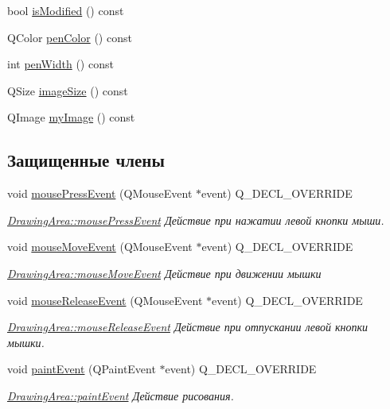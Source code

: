 \begin{DoxyCompactItemize}
bool \hyperlink{class_drawing_area_a727f9acc4083f97aa439eb6a6cb57adc}{is\+Modified} () const 
\item 
Q\+Color \hyperlink{class_drawing_area_a666bda2b4d8fc9bf5ea726f7c4b66df0}{pen\+Color} () const 
\item 
int \hyperlink{class_drawing_area_a2fbaa03b53f44c06190f72e6aad4f5fa}{pen\+Width} () const 
\item 
Q\+Size \hyperlink{class_drawing_area_af2a4193b01b408d8a9bbba44dfcefb77}{image\+Size} () const 
\item 
Q\+Image \hyperlink{class_drawing_area_a420f3cdf3a9f6df2f65d3a1e1b4c9d4d}{my\+Image} () const 
\end{DoxyCompactItemize}
\subsection*{Защищенные члены}
\begin{DoxyCompactItemize}
\item 
void \hyperlink{class_drawing_area_aa1fc7e0984fd5cb177956a894b106cf8}{mouse\+Press\+Event} (Q\+Mouse\+Event $\ast$event) Q\+\_\+\+D\+E\+C\+L\+\_\+\+O\+V\+E\+R\+R\+I\+D\+E
\begin{DoxyCompactList}\small\item\em \hyperlink{class_drawing_area_aa1fc7e0984fd5cb177956a894b106cf8}{Drawing\+Area\+::mouse\+Press\+Event} Действие при нажатии левой кнопки мыши. \end{DoxyCompactList}\item 
void \hyperlink{class_drawing_area_a4b4f2dbb4d819d5dd502142f4de4eee8}{mouse\+Move\+Event} (Q\+Mouse\+Event $\ast$event) Q\+\_\+\+D\+E\+C\+L\+\_\+\+O\+V\+E\+R\+R\+I\+D\+E
\begin{DoxyCompactList}\small\item\em \hyperlink{class_drawing_area_a4b4f2dbb4d819d5dd502142f4de4eee8}{Drawing\+Area\+::mouse\+Move\+Event} Действие при движении мышки \end{DoxyCompactList}\item 
void \hyperlink{class_drawing_area_ad97c6c8e6e2f444f26b76b73ffa30eea}{mouse\+Release\+Event} (Q\+Mouse\+Event $\ast$event) Q\+\_\+\+D\+E\+C\+L\+\_\+\+O\+V\+E\+R\+R\+I\+D\+E
\begin{DoxyCompactList}\small\item\em \hyperlink{class_drawing_area_ad97c6c8e6e2f444f26b76b73ffa30eea}{Drawing\+Area\+::mouse\+Release\+Event} Действие при отпускании левой кнопки мышки. \end{DoxyCompactList}\item 
void \hyperlink{class_drawing_area_af35f261193f389b319661c5915ffe66f}{paint\+Event} (Q\+Paint\+Event $\ast$event) Q\+\_\+\+D\+E\+C\+L\+\_\+\+O\+V\+E\+R\+R\+I\+D\+E
\begin{DoxyCompactList}\small\item\em \hyperlink{class_drawing_area_af35f261193f389b319661c5915ffe66f}{Drawing\+Area\+::paint\+Event} Действие рисования. \end{DoxyCompactList}\end{DoxyCompactItemize}
